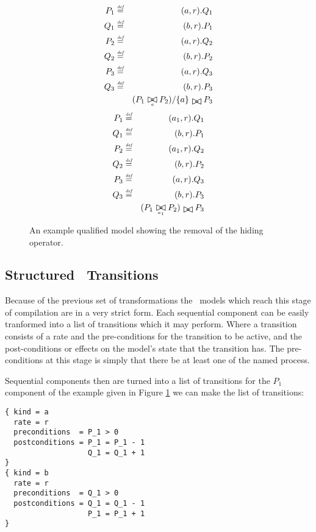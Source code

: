\begin{figure}
\begin{eqnarray*}
P_1 & \rmdef & (a, r) . Q_1 \\
Q_1 & \rmdef & (b, r) . P_1 \\
P_2 & \rmdef & (a, r) . Q_2 \\
Q_2 & \rmdef & (b, r) . P_2 \\
P_3 & \rmdef & (a, r) . Q_3 \\
Q_3 & \rmdef & (b, r) . P_3 \\
  & & (P_1 \sync{a} P_2)/\{a\} \sync{} P_3
\end{eqnarray*}
\begin{eqnarray*}
P_1 & \rmdef & (a_1, r) . Q_1 \\
Q_1 & \rmdef & (b, r) . P_1 \\
P_2 & \rmdef & (a_1, r) . Q_2 \\
Q_2 & \rmdef & (b, r) . P_2 \\
P_3 & \rmdef & (a, r) . Q_3 \\
Q_3 & \rmdef & (b, r) . P_3 \\
  & & (P_1 \sync{a_1} P_2) \sync{} P_3
\end{eqnarray*}
\caption{
\label{figure:removeHiding:Model}
An example qualified model showing the removal of the hiding operator.
}
\end{figure}

\subsection{Structured \hydra\ Transitions}
Because of the previous set of transformations the \pepa\ models which
reach this stage of compilation are in a very strict form.
Each sequential component can be easily tranformed into a list of transitions
which it may perform. Where a transition consists of a rate and the
pre-conditions for the transition to be active, and the post-conditions
or effects on the model's state that the transition has.
The pre-conditions at this
stage is simply that there be at least one of the named process.


Sequential components then are turned into a list of transitions for the
$P_1$ component of the example given in Figure
\ref{figure:removeHiding:Model}
we can make the list of transitions:

\begin{verbatim}
{ kind = a
  rate = r
  preconditions  = P_1 > 0
  postconditions = P_1 = P_1 - 1
                   Q_1 = Q_1 + 1   
}
{ kind = b
  rate = r
  preconditions  = Q_1 > 0
  postconditions = Q_1 = Q_1 - 1
                   P_1 = P_1 + 1
}
\end{verbatim}

